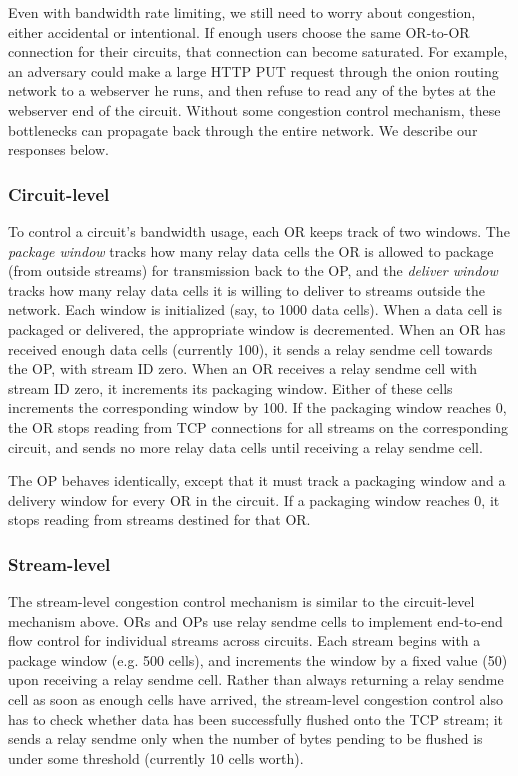 \documentclass[times,10pt,twocolumn]{article}
\begin{document}
Even with bandwidth rate limiting, we still need to worry about
congestion, either accidental or intentional. If enough users choose the
same OR-to-OR connection for their circuits, that connection can become
saturated. For example, an adversary could make a large HTTP PUT request
through the onion routing network to a webserver he runs, and then
refuse to read any of the bytes at the webserver end of the
circuit. Without some congestion control mechanism, these bottlenecks
can propagate back through the entire network.  We describe our
responses below.

\subsubsection{Circuit-level}

To control a circuit's bandwidth usage, each OR keeps track of two
windows. The \emph{package window} tracks how many relay data cells the OR is
allowed to package (from outside streams) for transmission back to the OP,
and the \emph{deliver window} tracks how many relay data cells it is willing
to deliver to streams outside the network. Each window is initialized
(say, to 1000 data cells). When a data cell is packaged or delivered,
the appropriate window is decremented. When an OR has received enough
data cells (currently 100), it sends a relay sendme cell towards the OP,
with stream ID zero. When an OR receives a relay sendme cell with stream
ID zero, it increments its packaging window. Either of these cells
increments the corresponding window by 100. If the packaging window
reaches 0, the OR stops reading from TCP connections for all streams
on the corresponding circuit, and sends no more relay data cells until
receiving a relay sendme cell.

The OP behaves identically, except that it must track a packaging window
and a delivery window for every OR in the circuit. If a packaging window
reaches 0, it stops reading from streams destined for that OR.

\subsubsection{Stream-level}

The stream-level congestion control mechanism is similar to the
circuit-level mechanism above. ORs and OPs use relay sendme cells
to implement end-to-end flow control for individual streams across
circuits. Each stream begins with a package window (e.g. 500 cells),
and increments the window by a fixed value (50) upon receiving a relay
sendme cell. Rather than always returning a relay sendme cell as soon
as enough cells have arrived, the stream-level congestion control also
has to check whether data has been successfully flushed onto the TCP
stream; it sends a relay sendme only when the number of bytes pending
to be flushed is under some threshold (currently 10 cells worth).
\end{document}
